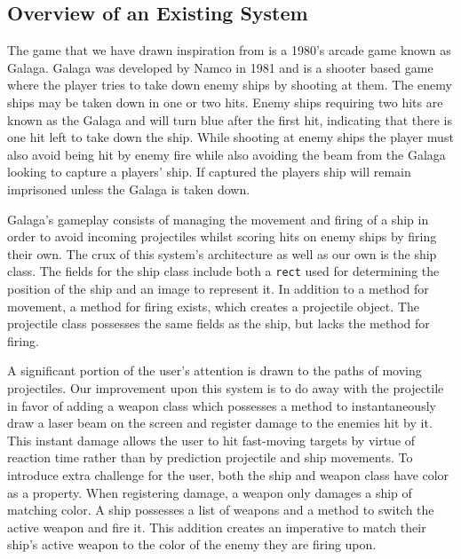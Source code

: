\subsection*{Overview of an Existing System}
The game that we have drawn inspiration from is a 1980’s arcade game
known as Galaga. Galaga was developed by Namco in 1981 and is a
shooter based game where the player tries to take down enemy ships
by shooting at them. The enemy ships may be taken down in one or two
hits. Enemy ships requiring two hits are known as the Galaga and
will turn blue after the first hit, indicating that there is one hit
left to take down the ship. While shooting at enemy ships the player
must also avoid being hit by enemy fire while also avoiding the beam
from the Galaga looking to capture a players’ ship. If captured the
players ship will remain imprisoned unless the Galaga is taken down.

Galaga's gameplay consists of managing the movement and firing of a
ship in order to avoid incoming projectiles whilst scoring hits on
enemy ships by firing their own. The crux of this system's
architecture as well as our own is the ship class. The fields for
the ship class include both a \texttt{rect} used for
determining the position of the ship and an image to represent it.
In addition to a method for movement, a method for firing exists,
which creates a projectile object. The projectile class possesses the
same fields as the ship, but lacks the method for firing.

A significant portion of the user's attention is drawn to the paths
of moving projectiles. Our improvement upon this system is to do
away with the projectile in favor of adding a weapon class which
possesses a method to instantaneously draw a laser beam on the
screen and register damage to the enemies hit by it. This instant
damage allows the user to hit fast-moving targets by virtue of
reaction time rather than by prediction projectile and ship
movements. To introduce extra challenge for the user, both the ship
and weapon class have color as a property. When registering damage,
a weapon only damages a ship of matching color. A ship possesses a
list of weapons and a method to switch the active weapon and fire
it. This addition creates an imperative to match their ship's active
weapon to the color of the enemy they are firing upon.

